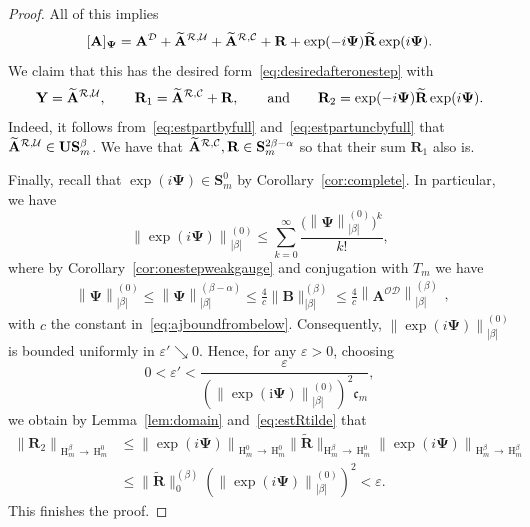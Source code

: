 \documentclass[AHL,Unicode,longabstracts,published]{cedram}
\newcommand{\RH}{\mathrm{H}}
\newcommand{\rmi}{\mathrm{i}}
\newcommand{\CC}{\mathcal{C}}
\newcommand{\CD}{\mathcal{D}}
\newcommand{\CO}{\mathcal{O}}
\newcommand{\CR}{\mathcal{R}}
\newcommand{\CU}{\mathcal{U}}
\newcommand{\COD}{{\CO\CD}}
\newcommand{\BPsi}{\boldsymbol \Psi}
\newcommand{\BA}{\mathbf A}
\newcommand{\BB}{\mathbf B}
\newcommand{\BS}{\mathbf S}
\newcommand{\BR}{\mathbf R}
\newcommand{\BU}{\mathbf U}
\newcommand{\BY}{\mathbf Y}
\newcommand{\Fc}{\mathfrak c}
\newcommand{\eps}{\varepsilon}
\renewcommand{\epsilon}{\varepsilon}
\newcommand{\norm}[1]{\left\| #1 \right\|}
\newcommand{\snorm}[3]{\left\| #1\right\|_{#3}^{(#2)}}
\let\oldtilde\tilde
\renewcommand*{\tilde}[1]{\mathchoice{\widetilde{#1}}{\widetilde{#1}}{\oldtilde{#1}}{\oldtilde{#1}}}
\begin{document}
\begin{proof}
All of this implies
\begin{equation}\label{eq:decompo}
[\BA]_{\BPsi} = \BA^\CD + \tilde \BA^{\CR,\CU} + \tilde \BA^{\CR,\CC} + \BR +
\exp(-i\BPsi) \tilde
\BR \exp(i \BPsi).
\end{equation}
We claim that this has the desired form~\eqref{eq:desiredafteronestep} with
\begin{equation}\label{eq:decompodetails}
\BY =
\tilde \BA^{\CR, \CU}, \qquad \BR_1 = \tilde \BA^{\CR,\CC} + \BR, \qquad
\text{and} \qquad \BR_2 =
\exp(-i \BPsi)
\tilde \BR \exp(i\BPsi).
\end{equation}
Indeed, it follows from~\eqref{eq:estpartbyfull} and~\eqref{eq:estpartuncbyfull} that $\tilde \BA^{\CR,\CU} \in \BU\BS^\beta_m$. We have that $\tilde \BA^{\CR,\CC}, \BR \in \BS_m^{2\beta - \alpha}$ so that their sum $\BR_1$ also is.

Finally, recall that $\exp(i\BPsi)\in\BS^0_m$ by Corollary~\ref{cor:complete}. In particular, we have
\begin{equation}
\snorm{\exp(i\BPsi)}{0}{|\beta|}\leq \sum\limits_{k=0}^\infty
\frac{\big(\snorm{\BPsi}{0}{|\beta|}\big)^k}{k!},
\end{equation}
where by Corollary~\ref{cor:onestepweakgauge} and conjugation with $T_m$ we have
\begin{equation}
\begin{aligned}
\snorm{\BPsi}{0}{|\beta|}\leq \snorm{\BPsi}{\beta-\alpha}{|\beta|}\le
\frac{4}{c}
\big\|\BB\big\|_{|\beta|}^{(\beta)} \leq \frac 4 c
\snorm{\BA^{\COD}}{\beta}{|\beta|}
\end{aligned},
\end{equation}
with $c$ the constant in~\eqref{eq:ajboundfrombelow}. Consequently, $\snorm{\exp(i\BPsi)}{0}{|\beta|}$ is bounded uniformly in $\epsilon'\searrow 0$. Hence, for any $\epsilon>0$, choosing
\begin{equation}
0< \eps' < \frac{\eps}{\left(\snorm{\exp(\rmi\BPsi)}{0}{|\beta|}\right)^2
\Fc_m},
\end{equation}
we obtain by Lemma~\ref{lem:domain} and~\eqref{eq:estRtilde} that
\begin{equation}\label{eq:normremainder}
\begin{aligned}
\norm{\BR_2}_{\RH_m^{\beta}\,\to\,\RH_m^0}&\leq \norm{\exp(i\BPsi)}_{\RH_m^0\,\to\,\RH_m^0}\big\|\widetilde{\BR}\big\|_{\RH_m^{\beta}\,\to\,\RH_m^0}\norm{\exp(i\BPsi)}_{\RH_m^{\beta}
\,\to\,\RH_m^{\beta}}\\
&\leq \big\|\widetilde{\BR}\big\|_{0}^{(\beta)}\left(\snorm{\exp(i\BPsi)}{0}{|\beta|}\right)^2<\epsilon.
\end{aligned}
\end{equation}
This finishes the proof.
\end{proof}
\end{document}
